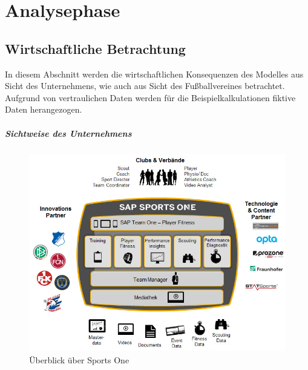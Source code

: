 \chapter{Analysephase}




\section{Wirtschaftliche Betrachtung}
\label{wa}
In diesem Abschnitt werden die wirtschaftlichen Konsequenzen des Modelles aus Sicht des Unternehmens, wie auch aus Sicht des Fußballvereines betrachtet.\enlargethispage{2\baselineskip}  Aufgrund von vertraulichen Daten werden für die Beispielkalkulationen fiktive Daten herangezogen.

\paragraph{Sichtweise des Unternehmens}

\begin{figure}[H]
\centering
\includegraphics[scale=0.575]{se-wa-jpg/sportsone}
\caption{Überblick über Sports One}
\label{sportsone}
\end{figure}

